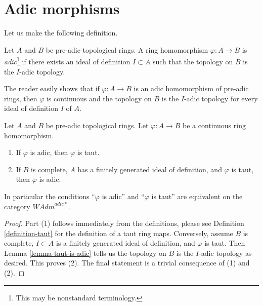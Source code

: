 \section{Adic morphisms}
\label{section-adic}

\noindent
Let us make the following definition.

\begin{definition}
\label{definition-adic-homomorphism}
Let $A$ and $B$ be pre-adic topological rings. A ring homomorphism
$\varphi : A \to B$ is {\it adic}\footnote{This may be nonstandard terminology.}
if there exists an ideal of definition $I \subset A$ such that
the topology on $B$ is the $I$-adic topology.
\end{definition}

\noindent
The reader easily shows that if $\varphi : A \to B$ is an adic
homomorphism of pre-adic rings, then $\varphi$ is continuous and
the topology on $B$ is the $I$-adic topology for every ideal
of definition $I$ of $A$.

\begin{lemma}
\label{lemma-adic-homomorphism}
Let $A$ and $B$ be pre-adic topological rings. Let
$\varphi : A \to B$ be a continuous ring homomorphism.
\begin{enumerate}
\item If $\varphi$ is adic, then $\varphi$ is taut.
\item If $B$ is complete, $A$ has a finitely generated
ideal of definition, and $\varphi$ is taut, then $\varphi$ is adic.
\end{enumerate}
In particular the conditions ``$\varphi$ is adic'' and ``$\varphi$ is taut''
are equivalent on the category $\textit{WAdm}^{adic*}$.
\end{lemma}

\begin{proof}
Part (1) follows immediately from the definitions, please see
Definition \ref{definition-taut} for the definition of a taut ring maps.
Conversely, assume $B$ is complete, $I \subset A$ is a finitely generated
ideal of definition, and $\varphi$ is taut. Then
Lemma \ref{lemma-taut-is-adic} tells us the topology on $B$
is the $I$-adic topology as desired. This proves (2). The final
statement is a trivial consequence of (1) and (2).
\end{proof}

